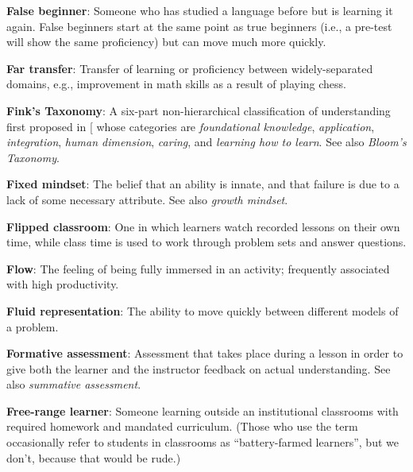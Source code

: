 \textbf{\hypertarget{g:false-beginner}{False beginner}\label{g:false-beginner}}: Someone who has studied a
language before but is learning it again. False beginners start at the
same point as true beginners (i.e., a pre-test will show the same
proficiency) but can move much more quickly.

\textbf{\hypertarget{g:far-transfer}{Far transfer}\label{g:far-transfer}}: Transfer of learning or
proficiency between widely-separated domains, e.g., improvement in math
skills as a result of playing chess.

\textbf{\hypertarget{g:finks-taxonomy}{Fink's Taxonomy}\label{g:finks-taxonomy}}: A six-part
non-hierarchical classification of understanding first proposed in
{[}\protect[\hyperlink{b:Fink2013}{Fink2013}]{]} whose categories are \emph{foundational knowledge},
\emph{application}, \emph{integration}, \emph{human dimension}, \emph{caring}, and \emph{learning
how to learn}. See also \emph{Bloom's Taxonomy}.

\textbf{\hypertarget{g:fixed-mindset}{Fixed mindset}\label{g:fixed-mindset}}: The belief that an ability
is innate, and that failure is due to a lack of some necessary
attribute. See also \emph{growth mindset}.

\textbf{\hypertarget{g:flipped-classroom}{Flipped classroom}\label{g:flipped-classroom}}: One in which
learners watch recorded lessons on their own time, while class time is
used to work through problem sets and answer questions.

\textbf{\hypertarget{g:flow}{Flow}\label{g:flow}}: The feeling of being fully immersed in an
activity; frequently associated with high productivity.

\textbf{\hypertarget{g:fluid-representation}{Fluid representation}\label{g:fluid-representation}}: The ability
to move quickly between different models of a problem.

\textbf{\hypertarget{g:formative-assessment}{Formative assessment}\label{g:formative-assessment}}: Assessment
that takes place during a lesson in order to give both the learner and
the instructor feedback on actual understanding. See also \emph{summative
assessment}.

\textbf{\hypertarget{g:free-range-learner}{Free-range learner}\label{g:free-range-learner}}: Someone learning
outside an institutional classrooms with required homework and mandated
curriculum. (Those who use the term occasionally refer to students in
classrooms as ``battery-farmed learners'', but we don't, because that
would be rude.)

